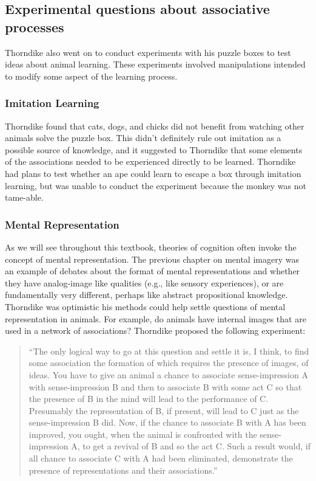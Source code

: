 \documentclass[
  oneside,
  12pt]{crumpbook}
\begin{document}
\hypertarget{experimental-questions-about-associative-processes}{%
\subsection{Experimental questions about associative processes}\label{experimental-questions-about-associative-processes}}

Thorndike also went on to conduct experiments with his puzzle boxes to test ideas about animal learning. These experiments involved manipulations intended to modify some aspect of the learning process.

\hypertarget{imitation-learning}{%
\subsubsection{Imitation Learning}\label{imitation-learning}}

Thorndike found that cats, dogs, and chicks did not benefit from watching other animals solve the puzzle box. This didn't definitely rule out imitation as a possible source of knowledge, and it suggested to Thorndike that some elements of the associations needed to be experienced directly to be learned. Thorndike had plans to test whether an ape could learn to escape a box through imitation learning, but was unable to conduct the experiment because the monkey was not tame-able.

\hypertarget{mental-representation}{%
\subsubsection{Mental Representation}\label{mental-representation}}

As we will see throughout this textbook, theories of cognition often invoke the concept of mental representation. The previous chapter on mental imagery was an example of debates about the format of mental representations and whether they have analog-image like qualities (e.g., like sensory experiences), or are fundamentally very different, perhaps like abstract propositional knowledge. Thorndike was optimistic his methods could help settle questions of mental representation in animals. For example, do animals have internal images that are used in a network of associations? Thorndike proposed the following experiment:

\begin{quote}
``The only logical way to go at this question and settle it is, I think, to find some association the formation of which requires the presence of images, of ideas. You have to give an animal a chance to associate sense-impression A with sense-impression B and then to associate B with some act C so that the presence of B in the mind will lead to the performance of C. Presumably the representation of B, if present, will lead to C just as the sense-impression B did. Now, if the chance to associate B with A has been improved, you ought, when the animal is confronted with the sense-impression A, to get a revival of B and so the act C. Such a result would, if all chance to associate C with A had been eliminated, demonstrate the presence of representations and their associations.''
\end{quote}
\end{document}
